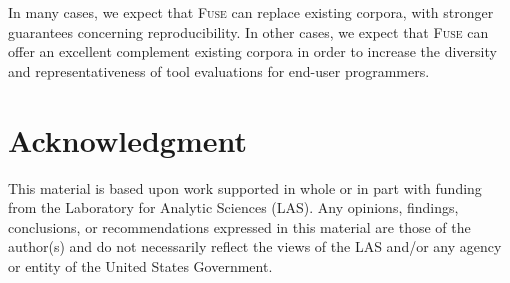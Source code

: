 \documentclass[conference]{IEEEtran}
\begin{document}
In many cases, we expect that \textsc{Fuse} can replace existing corpora, with stronger guarantees concerning reproducibility. In other cases, we expect that \textsc{Fuse} can offer an excellent complement existing corpora in order to increase the diversity and representativeness of tool evaluations for end-user programmers.








\section*{Acknowledgment}

This material is based upon work supported in whole or in part with funding from the Laboratory for Analytic Sciences (LAS). Any opinions, findings, conclusions, or recommendations expressed in this material are those of the author(s) and do not necessarily reflect the views of the LAS and/or any agency or entity of the United States Government.
\end{document}
